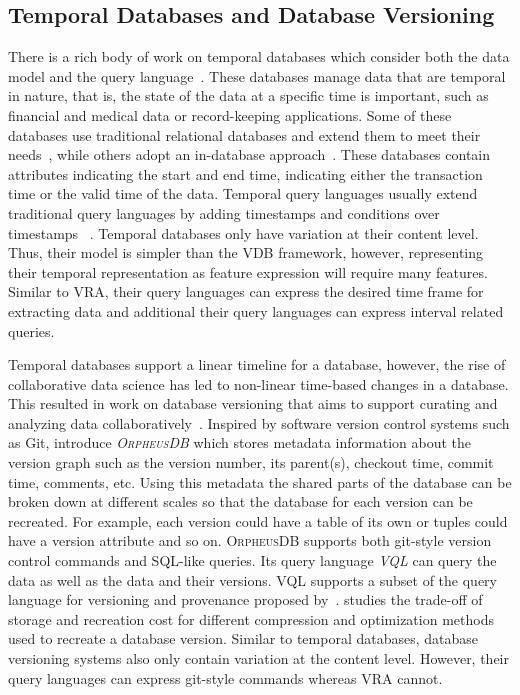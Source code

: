 \subsection{Temporal Databases and Database Versioning}
\label{sec:db-ver}

There is a rich body of work on temporal databases which consider both the data model and the query language~\cite{tempDataMng, tempDBSurv, tempDBbook}.
These databases manage data that are temporal in nature, that is, the state of the data at a specific
time is important, such as financial and medical data or record-keeping applications. 
%
Some of these databases use traditional relational databases and extend them to meet their 
needs~\cite{stratum,Teradata, db2}, while others adopt an in-database 
approach~\cite{KaufmannMVFKFM13sigmod}.
%
These databases contain attributes indicating the start and end time, indicating either 
the transaction time or the valid time of the data. Temporal query languages usually extend 
traditional query languages by adding timestamps and conditions over 
timestamps ~\cite{chomicki95,Jensen2009,evalTempLang}.
%
Temporal databases only have variation at their content level. Thus, their model is simpler 
than the VDB framework, however, representing their temporal representation as feature expression
will require many features. Similar to VRA, their query languages can express
the desired time frame for extracting data and additional their query languages can express
interval related queries.


Temporal databases support a linear timeline for a database, however, the rise of collaborative data 
science has led to non-linear time-based changes in a database. 
This resulted in work on database versioning that aims to support curating and analyzing data 
collaboratively~\cite{datahub15cidr}. Inspired by software version control systems such as Git, 
\citet{dbVersioning} introduce \emph{\textsc{OrpheusDB}} which stores metadata information
about the version graph such as 
the version number, its parent(s), checkout time, commit time, comments, etc. 
Using this metadata the shared parts of the database can be broken down at different scales so
that the database for each version can be recreated.
For example, each version could have a table of its own or 
tuples could have a version attribute and so on. 
\textsc{OrpheusDB} supports both git-style version control 
commands and SQL-like queries. Its query language \emph{VQL} can query the data 
as well as the data and their versions. VQL supports a subset of the query language for 
versioning and provenance proposed by~\citet{vqlAndProv}. 
\citet{datasetVersioning} studies the trade-off of storage and recreation cost for 
different compression and optimization methods used to recreate a database version.
%
Similar to temporal databases, database versioning systems also only contain variation
at the content level. However, their query languages can express git-style commands
whereas VRA cannot. 


